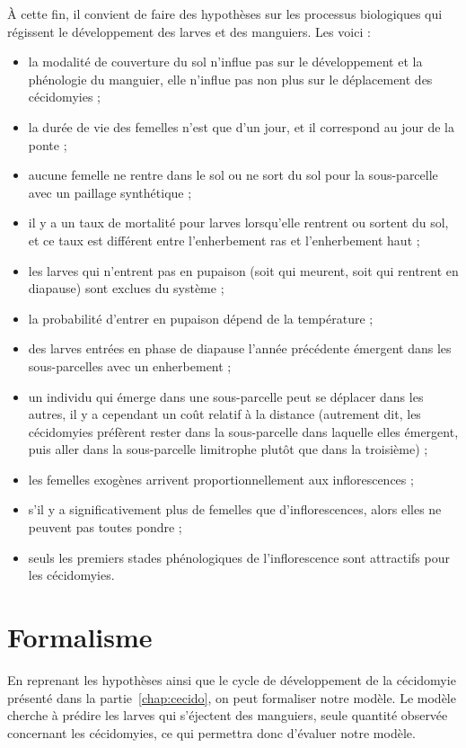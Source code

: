 À cette fin, il convient de faire des hypothèses sur les processus biologiques qui régissent le développement des larves et des manguiers.
Les voici :
\begin{itemize}
 \item la modalité de couverture du sol n'influe pas sur le développement et la phénologie du manguier, elle n'influe pas non plus sur le déplacement des cécidomyies ;
 \item la durée de vie des femelles n'est que d'un jour, et il correspond au jour de la ponte ;
 \item aucune femelle ne rentre dans le sol ou ne sort du sol pour la sous-parcelle avec un paillage synthétique ;
 \item il y a un taux de mortalité pour larves lorsqu'elle rentrent ou sortent du sol, et ce taux est différent entre l'enherbement ras et l'enherbement haut ;
 \item les larves qui n'entrent pas en pupaison (soit qui meurent, soit qui rentrent en diapause) sont exclues du système ;
 \item la probabilité d'entrer en pupaison dépend de la température ;
 \item des larves entrées en phase de diapause l'année précédente émergent dans les sous-parcelles avec un enherbement ;
 \item un individu qui émerge dans une sous-parcelle peut se déplacer dans les autres, il y a cependant un coût relatif à la distance (autrement dit, les cécidomyies préfèrent rester dans la sous-parcelle dans laquelle elles émergent, puis aller dans la sous-parcelle limitrophe plutôt que dans la troisième) ;
 \item les femelles exogènes arrivent proportionnellement aux inflorescences ;
 \item s'il y a significativement plus de femelles que d'inflorescences, alors elles ne peuvent pas toutes pondre ;
 \item  seuls les premiers stades phénologiques de l'inflorescence sont attractifs pour les cécidomyies.
\end{itemize}



\section{Formalisme}

En reprenant les hypothèses ainsi que le cycle de développement de la cécidomyie présenté dans la partie~\ref{chap:cecido}, on peut formaliser notre modèle.
Le modèle cherche à prédire les larves qui s'éjectent des manguiers, seule quantité observée concernant les cécidomyies, ce qui permettra donc d'évaluer notre modèle.

